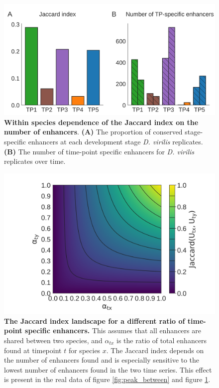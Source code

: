 \begin{figure}[H]
    \includegraphics[width=\linewidth]{ch.hourglass/images/enhancers_within.png}
    \caption{\textbf{Within species dependence of the Jaccard index on the number of enhancers}. \textbf{(A)} The proportion of conserved stage-specific enhancers at each development stage \textit{D. virilis} replicates. \textbf{(B)} The number of time-point specific enhancers for \textit{D. virilis} replicates over time. }
    \label{fig:peak_within}
\end{figure}

\begin{figure}[H]
    \center
    \includegraphics[width=0.8\linewidth]{ch.hourglass/images/math_flies.png}
    \caption{\textbf{The Jaccard index landscape for a different ratio of time-point specific enhancers.} This assumes that all enhancers are shared between two species, and $\alpha_{tx}$ is the ratio of total enhancers found at timepoint $t$ for species $x$. The Jaccard index depends on the number of enhancers found and is especially sensitive to the lowest number of enhancers found in the two time series. This effect is present in the real data of figure \ref{fig:peak_between} and figure \ref{fig:peak_within}. }
    \label{fig:peak_math}
\end{figure}

